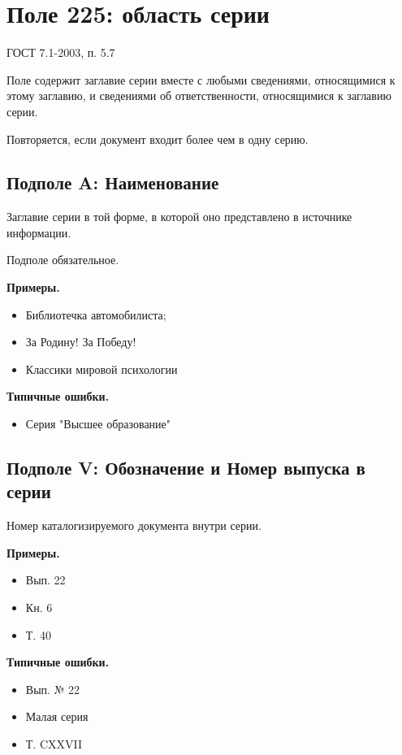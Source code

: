 \chapter{Поле 225: область серии}

ГОСТ 7.1-2003, п. 5.7

Поле содержит заглавие серии вместе с любыми сведениями, относящимися к этому заглавию, и сведениями об ответственности, относящимися к заглавию серии.

Повторяется, если документ входит более чем в одну серию.

\section{Подполе A: Наименование}

Заглавие серии в той форме, в которой оно представлено в источнике информации.

Подполе обязательное.

\textbf{Примеры.}

\begin{itemize}
	\item Библиотечка автомобилиста;
	\item За Родину! За Победу!
	\item Классики мировой психологии
\end{itemize}

\textbf{Типичные ошибки.}

\begin{itemize}
	\item Серия "Высшее образование"
\end{itemize}

\section{Подполе V: Обозначение и Номер выпуска в серии}

Номер каталогизируемого документа внутри серии.

\textbf{Примеры.}

\begin{itemize}
	\item Вып. 22
	\item Кн. 6
	\item Т. 40	
\end{itemize}

\textbf{Типичные ошибки.}

\begin{itemize}
	\item Вып. № 22
	\item Малая серия
	\item Т. CXXVII
\end{itemize}
